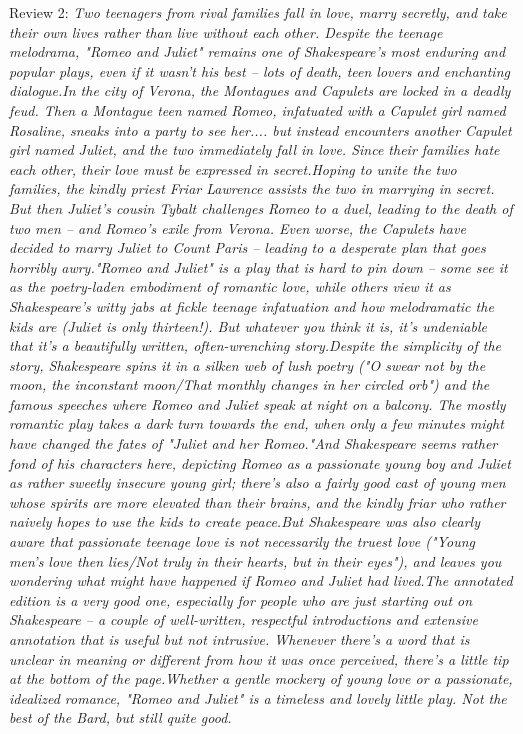 \documentclass[12pt, a4paper]{article}
\begin{document}
\begin{itemize}
{    \item Review 2: \textit{Two teenagers from rival families fall in love, marry secretly, and take their own lives rather than live without each other. Despite the teenage melodrama, "Romeo and Juliet" remains one of Shakespeare's most enduring and popular plays, even if it wasn't his best -- lots of death, teen lovers and enchanting dialogue.In the city of Verona, the Montagues and Capulets are locked in a deadly feud. Then a Montague teen named Romeo, infatuated with a Capulet girl named Rosaline, sneaks into a party to see her.... but instead encounters another Capulet girl named Juliet, and the two immediately fall in love. Since their families hate each other, their love must be expressed in secret.Hoping to unite the two families, the kindly priest Friar Lawrence assists the two in marrying in secret. But then Juliet's cousin Tybalt challenges Romeo to a duel, leading to the death of two men -- and Romeo's exile from Verona. Even worse, the Capulets have decided to marry Juliet to Count Paris -- leading to a desperate plan that goes horribly awry."Romeo and Juliet" is a play that is hard to pin down -- some see it as the poetry-laden embodiment of romantic love, while others view it as Shakespeare's witty jabs at fickle teenage infatuation and how melodramatic the kids are (Juliet is only thirteen!). But whatever you think it is, it's undeniable that it's a beautifully written, often-wrenching story.Despite the simplicity of the story, Shakespeare spins it in a silken web of lush poetry ("O swear not by the moon, the inconstant moon/That monthly changes in her circled orb") and the famous speeches where Romeo and Juliet speak at night on a balcony. The mostly romantic play takes a dark turn towards the end, when only a few minutes might have changed the fates of "Juliet and her Romeo."And Shakespeare seems rather fond of his characters here, depicting Romeo as a passionate young boy and Juliet as rather sweetly insecure young girl; there's also a fairly good cast of young men whose spirits are more elevated than their brains, and the kindly friar who rather naively hopes to use the kids to create peace.But Shakespeare was also clearly aware that passionate teenage love is not necessarily the truest love ("Young men's love then lies/Not truly in their hearts, but in their eyes"), and leaves you wondering what might have happened if Romeo and Juliet had lived.The annotated edition is a very good one, especially for people who are just starting out on Shakespeare -- a couple of well-written, respectful introductions and extensive annotation that is useful but not intrusive. Whenever there's a word that is unclear in meaning or different from how it was once perceived, there's a little tip at the bottom of the page.Whether a gentle mockery of young love or a passionate, idealized romance, "Romeo and Juliet" is a timeless and lovely little play. Not the best of the Bard, but still quite good.}
}
\end{itemize}
\end{document}
